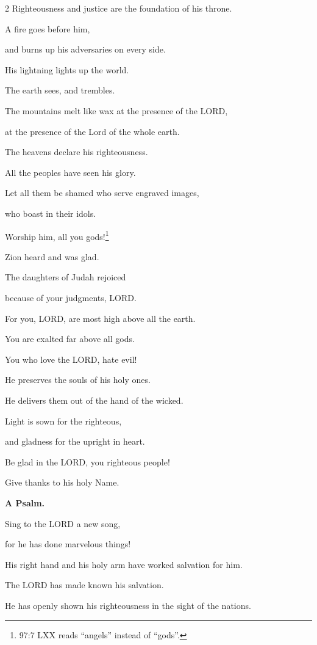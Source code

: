 \begin{multicols}{2}
	Righteousness and justice are the foundation of his throne.
	
	
	\myverse{}A fire goes before him,
	
	and burns up his adversaries on every side.
	
	
	\myverse{}His lightning lights up the world.
	
	The earth sees, and trembles.
	
	
	\myverse{}The mountains melt like wax at the presence of the LORD,
	
	at the presence of the Lord of the whole earth.
	
	
	\myverse{}The heavens declare his righteousness.
	
	All the peoples have seen his glory.
	
	
	\myverse{}Let all them be shamed who serve engraved images,
	
	who boast in their idols.
	
	Worship him, all you gods!\footnote{97:7 LXX reads “angels” instead of “gods”.}
	
	
	\myverse{}Zion heard and was glad.
	
	The daughters of Judah rejoiced
	
	because of your judgments, LORD.
	
	
	\myverse{}For you, LORD, are most high above all the earth.
	
	You are exalted far above all gods.
	
	
	\myverse{}You who love the LORD, hate evil!
	
	He preserves the souls of his holy ones.
	
	He delivers them out of the hand of the wicked.
	
	
	\myverse{}Light is sown for the righteous,
	
	and gladness for the upright in heart.
	
	
	\myverse{}Be glad in the LORD, you righteous people!
	
	Give thanks to his holy Name.
	
	
	\mychapter{}\textbf{A Psalm.}
	
\quad\quad	\myverse*{}Sing to the LORD a new song,
	
	for he has done marvelous things!
	
	His right hand and his holy arm have worked salvation for him.
	
	
	\myverse{}The LORD has made known his salvation.
	
	He has openly shown his righteousness in the sight of the nations.
	

\end{multicols}

